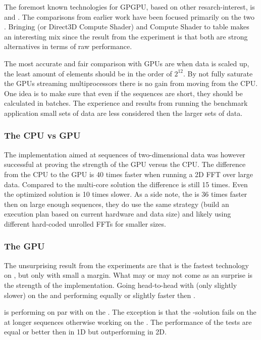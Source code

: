 The foremost known technologies for GPGPU, based on other resarch-interest, is {\CU} and {\OCL}. The comparisons from earlier work have been focused primarily on the two \cite{fang2011comprehensive, park2011design, su2012overview}. Bringing {\DX} (or Direct3D Compute Shader) and {\GL} Compute Shader to table makes an interesting mix since the result from the experiment is that both are strong alternatives in terms of raw performance.

The most accurate and fair comparison with GPUs are when data is scaled up, the least amount of elements should be in the order of $2^{12}$. By not fully saturate the GPUs streaming multiprocessors there is no gain from moving from the CPU. One idea is to make sure that even if the sequences are short, they should be calculated in batches. The experience and results from running the benchmark application small sets of data are less considered then the larger sets of data.

\subsubsection{The CPU vs GPU}

The implementation aimed at sequences of two-dimensional data was however successful at proving the strength of the GPU versus the CPU. The difference from the CPU to the GPU is 40 times faster when running a 2D FFT over large data. Compared to the multi-core {\OMP} solution the difference is still 15 times. Even the optimized {\FFTW} solution is 10 times slower. As a side note, the {\CUFFT} is 36 times faster then {\FFTW} on large enough sequences, they do use the same strategy (build an execution plan based on current hardware and data size) and likely using different hard-coded unrolled FFTs for smaller sizes.

\subsubsection{The GPU}

The unsurprising result from the experiments are that {\CU} is the fastest technology on {\NVCARD}, but only with small a margin. What may or may not come as an surprise is the strength of the {\DX} implementation. Going head-to-head with {\CU} (only slightly slower) on the {\NVCARD} and performing equally or slightly faster then {\OCL}.

{\GL} is performing on par with {\DX} on the {\AMDCARD}. The exception is that the {\GL}-solution fails on the {\AMDCARD} at longer sequences otherwise working on the {\NVCARD}. The performance of the {\GL} tests are equal or better then {\OCL} in 1D but outperforming {\OCL} in 2D.

